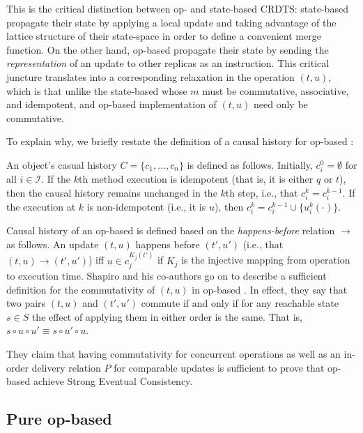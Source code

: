 This is the critical distinction between op- and state-based CRDTS:
state-based \CRDTs propagate their state by applying a local update and taking
advantage of the lattice structure of their state-space in order to define a
convenient merge function. On the other hand, op-based \CRDTs propagate their
state by sending the \textit{representation} of an update to other replicas as
an instruction. This critical juncture translates into a corresponding
relaxation in the operation $(t, u)$, which is that unlike the state-based \CRDTs
whose $m$ must be commutative, associative, and idempotent, and op-based \CRDT
implementation of $(t, u)$ need only be commutative.

To explain why, we briefly restate the definition of a causal history for
op-based \CRDTs:

\begin{definition}
An object's casual history $C = \{ c_1, \ldots, c_n \}$ is defined as follows.
Initially, $c_i^0 = \emptyset$ for all $i \in \mathcal{I}$. If the $k$th method
execution is idempotent (that is, it is either $q$ or $t$), then the causal
history remains unchanged in the $k$th step, i.e., that $c_i^k = c_i^{k-1}$. If
the execution at $k$ is non-idempotent (i.e., it is $u$), then $c_i^{k} =
c_i^{k-1} \cup \{ u_i^k(\cdot) \}$.
\end{definition}

Causal history of an op-based \CRDT is defined based on the
\textit{happens-before} relation $\to$ as follows. An update $(t,u)$ happens
before $(t',u')$ (i.e., that $(t, u) \to (t', u')$) iff $u \in c_{j}^{K_j(t')}$
if $K_j$ is the injective mapping from operation to execution time. Shapiro and
his co-authors go on to describe a sufficient definition for the commutativity
of $(t,u)$ in op-based \CRDTs. In effect, they say that two pairs $(t,u)$ and
$(t',u')$ commute if and only if for any reachable state $s \in S$ the effect of
applying them in either order is the same. That is, $s \circ u \circ u' \equiv s
\circ u' \circ u$.

They claim that having commutativity for concurrent operations as well as an
in-order delivery relation $P$ for comparable updates is sufficient to prove
that op-based \CRDTs achieve Strong Eventual Consistency.

\subsection{Pure op-based \CRDTs}

